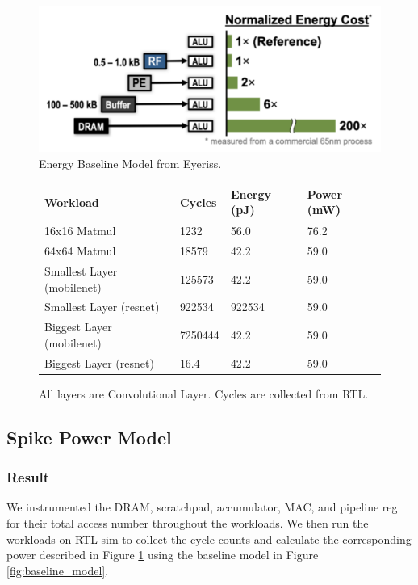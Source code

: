 \documentclass[sigconf]{acmart}
\begin{document}
\begin{figure}
  \begin{center}
    \includegraphics[width=\linewidth]{baseline_model.pdf}
  \end{center}
  \caption{Energy Baseline Model from Eyeriss.}
\end{figure}

\begin{figure}
  \begin{tabular}{ m{12em} | m{1cm}| m{1cm} | m{1cm} } 
    \textbf{Workload} & \textbf{Cycles} & \textbf{Energy (pJ)} & \textbf{Power (mW)} \\ \toprule
    16x16 Matmul & 1232 & 56.0 & 76.2 \\ \midrule
    64x64 Matmul & 18579 & 42.2 & 59.0 \\ \midrule
    Smallest Layer (mobilenet) & 125573 & 42.2 & 59.0 \\ \midrule
    Smallest Layer (resnet) & 922534 & 922534 & 59.0 \\ \midrule
    Biggest Layer (mobilenet) & 7250444 & 42.2 & 59.0 \\ \midrule
    Biggest Layer (resnet) & 16.4 & 42.2 & 59.0 \\ \midrule
    \bottomrule
  \end{tabular}
  \caption{All layers are Convolutional Layer. Cycles are collected from RTL.}
  \label{fig:spike_result}
\end{figure}

\subsection{Spike Power Model}
\subsubsection{Result}
We instrumented the DRAM, scratchpad, accumulator, MAC, and pipeline reg for their total access number throughout the workloads. We then run the workloads on RTL sim to collect the cycle counts and calculate the corresponding power described in Figure \ref{fig:spike_result} using the baseline model in Figure \ref{fig:baseline_model}.
\end{document}

